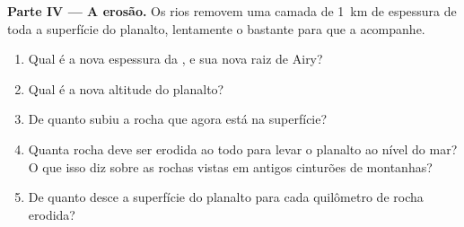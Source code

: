 \begin{problem}
\noindent\textbf{Parte IV --- A erosão.}
Os rios removem uma camada de \qty{1}{km} de espessura de toda a superfície do planalto,
lentamente o bastante para que a  acompanhe.
\begin{enumerate}[resume]
  \item Qual é a nova espessura da , e sua nova raiz de Airy?
  \item Qual é a nova altitude do planalto?
  \item De quanto subiu a rocha que agora está na superfície?
  \item Quanta rocha deve ser erodida ao todo para levar o planalto ao nível do
        mar? O que isso diz sobre as rochas vistas em antigos cinturões de montanhas?
  \item De quanto desce a superfície do planalto para cada quilômetro de rocha
        erodida?
\end{enumerate}
\end{problem}
